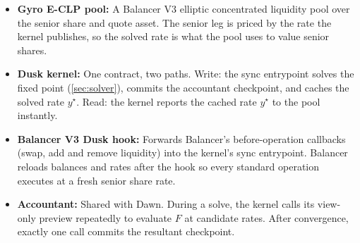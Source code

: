 \begin{itemize}
  \item \textbf{Gyro E-CLP pool:} A Balancer V3 elliptic concentrated
    liquidity pool over the senior share and quote asset. The senior
    leg is priced by the rate the kernel publishes, so the solved rate
    is what the pool uses to value senior shares.
  \item \textbf{Dusk kernel:} One contract, two paths. Write: the sync
    entrypoint solves the fixed point (\cref{sec:solver}), commits the
    accountant checkpoint, and caches the solved rate $y^\star$. Read:
    the kernel reports the cached rate $y^\star$ to the pool instantly.
  \item \textbf{Balancer V3 Dusk hook:} Forwards Balancer's before-operation
    callbacks (swap, add and remove liquidity) into the kernel's sync
    entrypoint. Balancer reloads balances and rates after the hook so
    every standard operation executes at a fresh senior share rate.
  \item \textbf{Accountant:} Shared with Dawn. During a solve, the
    kernel calls its view-only preview repeatedly to evaluate $F$ at
    candidate rates. After convergence, exactly one call commits the
    resultant checkpoint.
\end{itemize}
